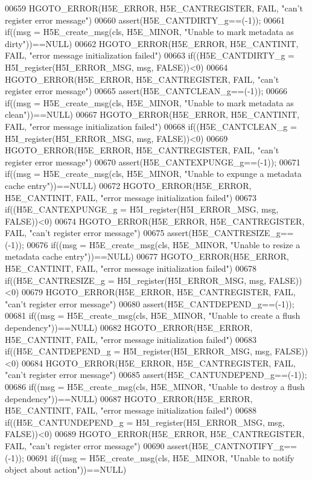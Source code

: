 \begin{DoxyCode}
00659     HGOTO\_ERROR(H5E\_ERROR, H5E\_CANTREGISTER, FAIL, "can't register error message")
00660 assert(H5E\_CANTDIRTY\_g==(-1));
00661 if((msg = H5E\_create\_msg(cls, H5E\_MINOR, "Unable to mark metadata as dirty"))==NULL)
00662     HGOTO\_ERROR(H5E\_ERROR, H5E\_CANTINIT, FAIL, "error message initialization failed")
00663 if((H5E\_CANTDIRTY\_g = H5I\_register(H5I\_ERROR\_MSG, msg, FALSE))<0)
00664     HGOTO\_ERROR(H5E\_ERROR, H5E\_CANTREGISTER, FAIL, "can't register error message")
00665 assert(H5E\_CANTCLEAN\_g==(-1));
00666 if((msg = H5E\_create\_msg(cls, H5E\_MINOR, "Unable to mark metadata as clean"))==NULL)
00667     HGOTO\_ERROR(H5E\_ERROR, H5E\_CANTINIT, FAIL, "error message initialization failed")
00668 if((H5E\_CANTCLEAN\_g = H5I\_register(H5I\_ERROR\_MSG, msg, FALSE))<0)
00669     HGOTO\_ERROR(H5E\_ERROR, H5E\_CANTREGISTER, FAIL, "can't register error message")
00670 assert(H5E\_CANTEXPUNGE\_g==(-1));
00671 if((msg = H5E\_create\_msg(cls, H5E\_MINOR, "Unable to expunge a metadata cache entry"))==NULL)
00672     HGOTO\_ERROR(H5E\_ERROR, H5E\_CANTINIT, FAIL, "error message initialization failed")
00673 if((H5E\_CANTEXPUNGE\_g = H5I\_register(H5I\_ERROR\_MSG, msg, FALSE))<0)
00674     HGOTO\_ERROR(H5E\_ERROR, H5E\_CANTREGISTER, FAIL, "can't register error message")
00675 assert(H5E\_CANTRESIZE\_g==(-1));
00676 if((msg = H5E\_create\_msg(cls, H5E\_MINOR, "Unable to resize a metadata cache entry"))==NULL)
00677     HGOTO\_ERROR(H5E\_ERROR, H5E\_CANTINIT, FAIL, "error message initialization failed")
00678 if((H5E\_CANTRESIZE\_g = H5I\_register(H5I\_ERROR\_MSG, msg, FALSE))<0)
00679     HGOTO\_ERROR(H5E\_ERROR, H5E\_CANTREGISTER, FAIL, "can't register error message")
00680 assert(H5E\_CANTDEPEND\_g==(-1));
00681 if((msg = H5E\_create\_msg(cls, H5E\_MINOR, "Unable to create a flush dependency"))==NULL)
00682     HGOTO\_ERROR(H5E\_ERROR, H5E\_CANTINIT, FAIL, "error message initialization failed")
00683 if((H5E\_CANTDEPEND\_g = H5I\_register(H5I\_ERROR\_MSG, msg, FALSE))<0)
00684     HGOTO\_ERROR(H5E\_ERROR, H5E\_CANTREGISTER, FAIL, "can't register error message")
00685 assert(H5E\_CANTUNDEPEND\_g==(-1));
00686 if((msg = H5E\_create\_msg(cls, H5E\_MINOR, "Unable to destroy a flush dependency"))==NULL)
00687     HGOTO\_ERROR(H5E\_ERROR, H5E\_CANTINIT, FAIL, "error message initialization failed")
00688 if((H5E\_CANTUNDEPEND\_g = H5I\_register(H5I\_ERROR\_MSG, msg, FALSE))<0)
00689     HGOTO\_ERROR(H5E\_ERROR, H5E\_CANTREGISTER, FAIL, "can't register error message")
00690 assert(H5E\_CANTNOTIFY\_g==(-1));
00691 if((msg = H5E\_create\_msg(cls, H5E\_MINOR, "Unable to notify \textcolor{keywordtype}{object} about action"))==NULL)

\end{DoxyCode}

